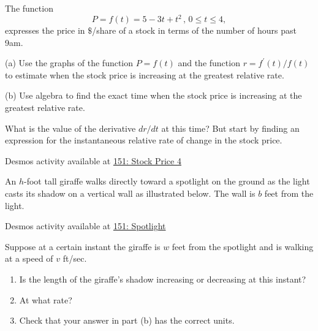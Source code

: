 \documentclass{ximera}
\begin{document}
\begin{exercise}  \label{EEdvbrttyer}
The function 
\[
      P = f(t) = 5 -3t + t^2 \, , \, 0\leq t \leq 4 , 
\]
expresses the price in $\$$/share of a stock in terms of the number of hours past 9am.

(a) Use the graphs of the function $P=f(t)$ and the function $r=f^\prime(t)/f(t)$  to estimate when the stock price is increasing at the greatest relative rate.

(b) Use algebra to find the exact time when the stock price is increasing at the greatest relative rate.
\begin{hint}
What is the value of the derivative $dr/dt$ at this time? But start by finding an expression for the instantaneous relative rate of change in the stock price.
\end{hint}


\begin{onlineOnly}
    \begin{center}
\end{center}
\end{onlineOnly}

Desmos activity available at \href{https://www.desmos.com/calculator/xuupp3srqv}{151: Stock Price 4}

\end{exercise}


\begin{exercise}  \label{EEdgvbfghjjjyu}

An $h$-foot tall giraffe walks directly toward a spotlight on the ground as the light casts its shadow on a vertical wall as illustrated below. The wall is $b$ feet from the light.

\begin{onlineOnly}
    \begin{center}
\end{center}
\end{onlineOnly}

Desmos activity available at \href{https://www.desmos.com/calculator/2eiyjjpu9n}{151: Spotlight}

Suppose at a certain instant the giraffe is $w$ feet from the spotlight and is walking at a speed of $v$ ft/sec. 

\begin{enumerate}

\item Is the length of the giraffe's shadow increasing or decreasing at this instant? 

\item At what rate? 

\item Check that your answer in part (b) has the correct units.

\end{enumerate}

\end{exercise}
\end{document}

